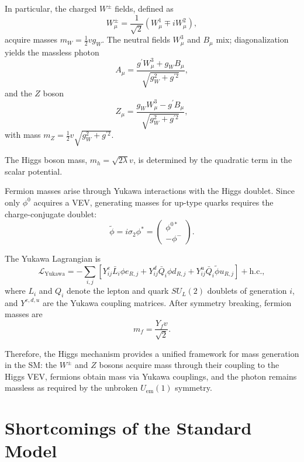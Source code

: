 In particular, the charged $W^\pm$ fields, defined as
\begin{equation}
W^\pm_\mu = \frac{1}{\sqrt{2}}(W_\mu^1 \mp iW_\mu^2),
\end{equation}
acquire masses $m_W=\frac{1}{2}vg_W$.
The neutral fields $W_\mu^3$ and $B_\mu$ mix; diagonalization yields the massless photon
\begin{equation}
A_\mu = \frac{g^\prime W_\mu^3 + g_W B_\mu}{\sqrt{g_W^2+g^{\prime 2}}},
\end{equation}
and the $Z$ boson
\begin{equation}
Z_\mu = \frac{g_W W_\mu^3 - g^\prime B_\mu}{\sqrt{g_W^2+g^{\prime 2}}},
\end{equation}
with mass $m_Z = \frac{1}{2}v\sqrt{g_W^2+g^{\prime 2}}$.

The Higgs boson mass, $m_h = \sqrt{2\lambda}v$, is determined by the quadratic term in the scalar potential.

Fermion masses arise through Yukawa interactions with the Higgs doublet. Since only $\phi^0$ acquires a VEV, generating masses for up-type quarks requires the charge-conjugate doublet:
\begin{equation}
\tilde{\phi} = i\sigma_2 \phi^* = \begin{pmatrix} \phi^{0*} \\ -\phi^- \end{pmatrix}.
\end{equation}

The Yukawa Lagrangian is
\begin{equation}
\mathcal{L}_{\text{Yukawa}} = -\sum_{i,j} \left[ Y^e_{ij} \bar{L}_i \phi e_{R,j} + Y^d_{ij} \bar{Q}_i \phi d_{R,j} + Y^u_{ij} \bar{Q}_i \tilde{\phi} u_{R,j} \right] + \text{h.c.},
\end{equation}
where $L_i$ and $Q_i$ denote the lepton and quark $SU_L(2)$ doublets of generation $i$, and $Y^{e,d,u}$ are the Yukawa coupling matrices. After symmetry breaking, fermion masses are
\begin{equation}
m_f = \frac{Y_f v}{\sqrt{2}}.
\end{equation}

Therefore, the Higgs mechanism provides a unified framework for mass generation in the SM: the $W^\pm$ and $Z$ bosons acquire mass through their coupling to the Higgs VEV, fermions obtain mass via Yukawa couplings, and the photon remains massless as required by the unbroken $U_\mathrm{em}(1)$ symmetry.


\section{Shortcomings of the Standard Model}

